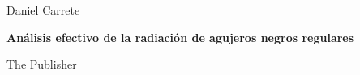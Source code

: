\documentclass[a4paper,12pt]{book}
\newcommand*{\plogo}{\fbox{$\mathcal{PL}$}} %
\begin{document}

\begin{titlepage} %

	\raggedleft %
	
	\vspace*{\baselineskip} %
	
	
	{\Large Daniel Carrete} %
	
	\vspace*{0.167\textheight} %
	
	
	\textbf{\LARGE Análisis efectivo de la radiación de
	agujeros negros regulares}\\[\baselineskip] %
	
	
	
	\vfill %
	
	
	{\large The Publisher~~\plogo} %
	
	\vspace*{3\baselineskip} %
\end{titlepage}



\printbibliography
\nocite{*}
\end{document}
